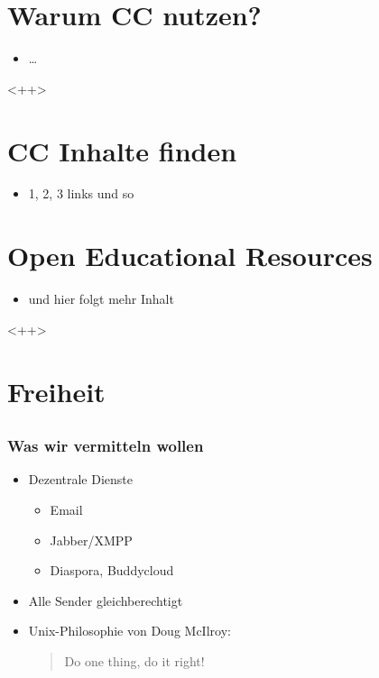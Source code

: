 \documentclass{beamer}
\begin{document}
\section{Warum CC nutzen?}
\begin{itemize}
    \item<2-> \ldots
\end{itemize}<++>
\section{CC Inhalte finden}
\begin{itemize}
    \item<2-> 1, 2, 3 links und so
\end{itemize}
\section{Open Educational Resources}
\begin{itemize}
    \item<2-> und hier folgt mehr Inhalt
\end{itemize}<++>

\section{Freiheit}
\subsection{}

\begin{frame}
    \frametitle{Was wir vermitteln wollen}
    \begin{itemize}
        \item<2-> Dezentrale Dienste
            \begin{itemize}
                \item<3-> Email
                \item<4-> Jabber/XMPP
                \item<5-> Diaspora, Buddycloud
            \end{itemize}
        \item<6-> Alle Sender gleichberechtigt
        \item<7-> Unix-Philosophie von Doug McIlroy:
            \begin{quote}Do one thing, do it right!
            \end{quote}
    \end{itemize}
\end{frame}
\end{document}

